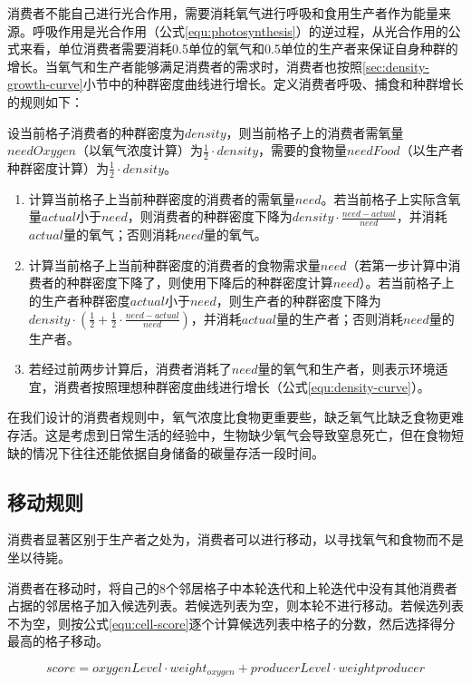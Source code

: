 \documentclass{ctexart}
\begin{document}
消费者不能自己进行光合作用，需要消耗氧气进行呼吸和食用生产者作为能量来源。呼吸作用是光合作用（公式\ref{equ:photosynthesis}）的逆过程，从光合作用的公式来看，单位消费者需要消耗0.5单位的氧气和0.5单位的生产者来保证自身种群的增长。当氧气和生产者能够满足消费者的需求时，消费者也按照\ref{sec:density-growth-curve}小节中的种群密度曲线进行增长。定义消费者呼吸、捕食和种群增长的规则如下：

设当前格子消费者的种群密度为$density$，则当前格子上的消费者需氧量$needOxygen$（以氧气浓度计算）为$\frac {1}{2} \cdot density$，需要的食物量$needFood$（以生产者种群密度计算）为$\frac {1}{2} \cdot density$。

\begin{enumerate}
  \item 计算当前格子上当前种群密度的消费者的需氧量$need$。若当前格子上实际含氧量$actual$小于$need$，则消费者的种群密度下降为$density \cdot \frac{need - actual}{need}$，并消耗$actual$量的氧气；否则消耗$need$量的氧气。
  \item 计算当前格子上当前种群密度的消费者的食物需求量$need$（若第一步计算中消费者的种群密度下降了，则使用下降后的种群密度计算$need$）。若当前格子上的生产者种群密度$actual$小于$need$，则生产者的种群密度下降为$density \cdot (\frac{1}{2} + \frac{1}{2} \cdot \frac{need - actual}{need})$，并消耗$actual$量的生产者；否则消耗$need$量的生产者。
  \item 若经过前两步计算后，消费者消耗了$need$量的氧气和生产者，则表示环境适宜，消费者按照理想种群密度曲线进行增长（公式\ref{equ:density-curve}）。
\end{enumerate}

在我们设计的消费者规则中，氧气浓度比食物更重要些，缺乏氧气比缺乏食物更难存活。这是考虑到日常生活的经验中，生物缺少氧气会导致窒息死亡，但在食物短缺的情况下往往还能依据自身储备的碳量存活一段时间。

\subsection{移动规则}

消费者显著区别于生产者之处为，消费者可以进行移动，以寻找氧气和食物而不是坐以待毙。

消费者在移动时，将自己的8个邻居格子中本轮迭代和上轮迭代中没有其他消费者占据的邻居格子加入候选列表。若候选列表为空，则本轮不进行移动。若候选列表不为空，则按公式\ref{equ:cell-score}逐个计算候选列表中格子的分数，然后选择得分最高的格子移动。

\begin{equation}
  \label{equ:cell-score}
  score = oxygenLevel \cdot weight_{oxygen} + producerLevel \cdot weight{producer}
\end{equation}
\end{document}
